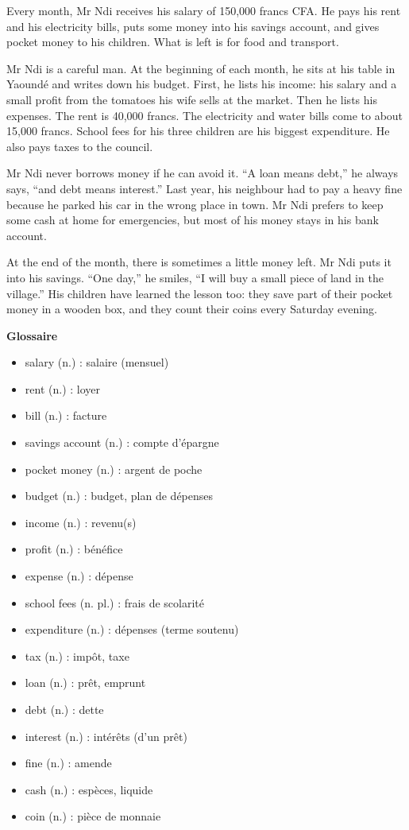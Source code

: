 \documentclass[11pt]{article}
\newcommand{\cle}[1]{{\popxbold\color{popdark}#1}}
\begin{document}
\begin{textebox}
Every month, Mr Ndi receives his salary of 150,000 francs CFA. He pays his rent and his electricity bills, puts some money into his savings account, and gives pocket money to his children. What is left is for food and transport.

Mr Ndi is a careful man. At the beginning of each month, he sits at his table in Yaoundé and writes down his budget. First, he lists his income: his salary and a small profit from the tomatoes his wife sells at the market. Then he lists his expenses. The rent is 40,000 francs. The electricity and water bills come to about 15,000 francs. School fees for his three children are his biggest expenditure. He also pays taxes to the council.

Mr Ndi never borrows money if he can avoid it. “A loan means debt,” he always says, “and debt means interest.” Last year, his neighbour had to pay a heavy fine because he parked his car in the wrong place in town. Mr Ndi prefers to keep some cash at home for emergencies, but most of his money stays in his bank account.

At the end of the month, there is sometimes a little money left. Mr Ndi puts it into his savings. “One day,” he smiles, “I will buy a small piece of land in the village.” His children have learned the lesson too: they save part of their pocket money in a wooden box, and they count their coins every Saturday evening.
\end{textebox}

\textbf{Glossaire}\par
\begin{itemize}
\item \cle{salary} (n.) : salaire (mensuel)
\item \cle{rent} (n.) : loyer
\item \cle{bill} (n.) : facture
\item \cle{savings account} (n.) : compte d'épargne
\item \cle{pocket money} (n.) : argent de poche
\item \cle{budget} (n.) : budget, plan de dépenses
\item \cle{income} (n.) : revenu(s)
\item \cle{profit} (n.) : bénéfice
\item \cle{expense} (n.) : dépense
\item \cle{school fees} (n. pl.) : frais de scolarité
\item \cle{expenditure} (n.) : dépenses (terme soutenu)
\item \cle{tax} (n.) : impôt, taxe
\item \cle{loan} (n.) : prêt, emprunt
\item \cle{debt} (n.) : dette
\item \cle{interest} (n.) : intérêts (d'un prêt)
\item \cle{fine} (n.) : amende
\item \cle{cash} (n.) : espèces, liquide
\item \cle{coin} (n.) : pièce de monnaie
\end{itemize}
\end{document}
